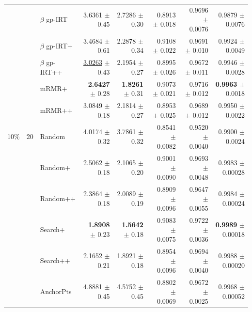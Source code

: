 \begin{longtable}{llp{}rrrrr}
 &  & $\beta$ gp-IRT & 3.6361 {\scriptsize $\pm$ 0.45} & 2.7286 {\scriptsize $\pm$ 0.30} & 0.8913 {\scriptsize $\pm$ 0.018} & 0.9696 {\scriptsize $\pm$ 0.0076} & 0.9879 {\scriptsize $\pm$ 0.0076} \\
 &  & $\beta$ gp-IRT+ & 3.4684 {\scriptsize $\pm$ 0.61} & 2.2878 {\scriptsize $\pm$ 0.34} & 0.9108 {\scriptsize $\pm$ 0.022} & 0.9691 {\scriptsize $\pm$ 0.010} & 0.9924 {\scriptsize $\pm$ 0.0049} \\
 &  & $\beta$ gp-IRT++ & \underline{3.0263} {\scriptsize $\pm$ 0.43} & 2.1954 {\scriptsize $\pm$ 0.27} & 0.8995 {\scriptsize $\pm$ 0.026} & 0.9672 {\scriptsize $\pm$ 0.011} & 0.9946 {\scriptsize $\pm$ 0.0028} \\
 &  & mRMR+ & \textbf{2.6427} {\scriptsize $\pm$ 0.28} & \textbf{1.8261} {\scriptsize $\pm$ 0.31} & 0.9073 {\scriptsize $\pm$ 0.021} & 0.9716 {\scriptsize $\pm$ 0.012} & \textbf{0.9963} {\scriptsize $\pm$ 0.0018} \\
 &  & mRMR++ & 3.0849 {\scriptsize $\pm$ 0.18} & 2.1814 {\scriptsize $\pm$ 0.27} & 0.8953 {\scriptsize $\pm$ 0.025} & 0.9689 {\scriptsize $\pm$ 0.012} & 0.9950 {\scriptsize $\pm$ 0.0022} \\
\midrule
10\% & 20 & Random & 4.0174 {\scriptsize $\pm$ 0.32} & 3.7861 {\scriptsize $\pm$ 0.32} & 0.8541 {\scriptsize $\pm$ 0.0082} & 0.9520 {\scriptsize $\pm$ 0.0040} & 0.9900 {\scriptsize $\pm$ 0.0024} \\
 &  & Random+ & 2.5062 {\scriptsize $\pm$ 0.18} & 2.1065 {\scriptsize $\pm$ 0.20} & 0.9001 {\scriptsize $\pm$ 0.0090} & 0.9693 {\scriptsize $\pm$ 0.0048} & 0.9983 {\scriptsize $\pm$ 0.00028} \\
 &  & Random++ & 2.3864 {\scriptsize $\pm$ 0.18} & 2.0089 {\scriptsize $\pm$ 0.19} & 0.8909 {\scriptsize $\pm$ 0.0096} & 0.9647 {\scriptsize $\pm$ 0.0055} & 0.9984 {\scriptsize $\pm$ 0.00024} \\
 &  & Search+ & \textbf{1.8908} {\scriptsize $\pm$ 0.23} & \textbf{1.5642} {\scriptsize $\pm$ 0.18} & 0.9083 {\scriptsize $\pm$ 0.0075} & 0.9722 {\scriptsize $\pm$ 0.0036} & \textbf{0.9989} {\scriptsize $\pm$ 0.00018} \\
 &  & Search++ & 2.1652 {\scriptsize $\pm$ 0.21} & 1.8921 {\scriptsize $\pm$ 0.18} & 0.8954 {\scriptsize $\pm$ 0.0096} & 0.9694 {\scriptsize $\pm$ 0.0040} & 0.9988 {\scriptsize $\pm$ 0.00020} \\
 &  & AnchorPts & 4.8881 {\scriptsize $\pm$ 0.45} & 4.5752 {\scriptsize $\pm$ 0.45} & 0.8802 {\scriptsize $\pm$ 0.0069} & 0.9672 {\scriptsize $\pm$ 0.0025} & 0.9968 {\scriptsize $\pm$ 0.00052} \\

\end{longtable}

